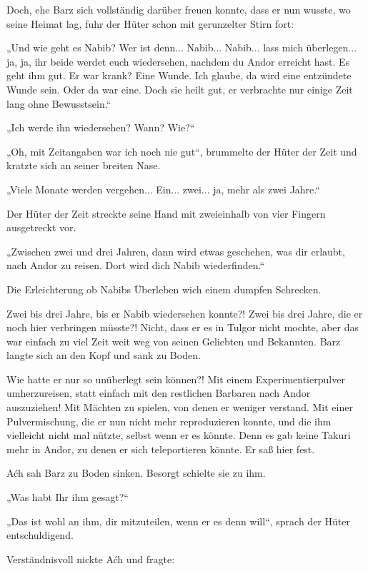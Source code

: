 Doch, ehe Barz sich vollständig darüber freuen konnte, dass er nun wusste, wo seine Heimat lag, fuhr der Hüter schon mit gerunzelter Stirn fort:

„Und wie geht es Nabib? Wer ist denn... Nabib... Nabib... lass mich überlegen... ja, ja, ihr beide werdet euch wiedersehen, nachdem du Andor erreicht hast. Es geht ihm gut. Er war krank? Eine Wunde. Ich glaube, da wird eine entzündete Wunde sein. Oder da war eine. Doch sie heilt gut, er verbrachte nur einige Zeit lang ohne Bewusstsein.“

„Ich werde ihn wiedersehen? Wann? Wie?“

„Oh, mit Zeitangaben war ich noch nie gut“, brummelte der Hüter der Zeit und kratzte sich an seiner breiten Nase.

„Viele Monate werden vergehen... Ein... zwei... ja, mehr als zwei Jahre.“

Der Hüter der Zeit streckte seine Hand mit zweieinhalb von vier Fingern ausgetreckt vor.

„Zwischen zwei und drei Jahren, dann wird etwas geschehen, was dir erlaubt, nach Andor zu reisen. Dort wird dich Nabib wiederfinden.“

Die Erleichterung ob Nabibs Überleben wich einem dumpfen Schrecken.

Zwei bis drei Jahre, bis er Nabib wiedersehen konnte?! Zwei bis drei Jahre, die er noch hier verbringen müsste?! Nicht, dass er es in Tulgor nicht mochte, aber das war einfach zu viel Zeit weit weg von seinen Geliebten und Bekannten. Barz langte sich an den Kopf und sank zu Boden.

Wie hatte er nur so unüberlegt sein können?! Mit einem Experimentierpulver umherzureisen, statt einfach mit den restlichen Barbaren nach Andor auszuziehen! Mit Mächten zu spielen, von denen er weniger verstand. Mit einer Pulvermischung, die er nun nicht mehr reproduzieren konnte, und die ihm vielleicht nicht mal nützte, selbst wenn er es könnte. Denn es gab keine Takuri mehr in Andor, zu denen er sich teleportieren könnte. Er saß hier fest.\bigskip







Aćh sah Barz zu Boden sinken. Besorgt schielte sie zu ihm.

„Was habt Ihr ihm gesagt?“

„Das ist wohl an ihm, dir mitzuteilen, wenn er es denn will“, sprach der Hüter entschuldigend.

Verständnisvoll nickte Aćh und fragte:

